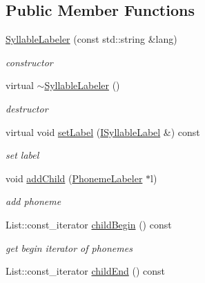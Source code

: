\subsection*{\-Public \-Member \-Functions}
\begin{DoxyCompactItemize}
\item 
\hypertarget{classsinsy_1_1SyllableLabeler_a91b3bff4ba682519268f7b9b1b477e45}{\hyperlink{classsinsy_1_1SyllableLabeler_a91b3bff4ba682519268f7b9b1b477e45}{\-Syllable\-Labeler} (const std\-::string \&lang)}\label{classsinsy_1_1SyllableLabeler_a91b3bff4ba682519268f7b9b1b477e45}

\begin{DoxyCompactList}\small\item\em constructor \end{DoxyCompactList}\item 
\hypertarget{classsinsy_1_1SyllableLabeler_a577205cd458a184e916c1308dbeeafe1}{virtual \hyperlink{classsinsy_1_1SyllableLabeler_a577205cd458a184e916c1308dbeeafe1}{$\sim$\-Syllable\-Labeler} ()}\label{classsinsy_1_1SyllableLabeler_a577205cd458a184e916c1308dbeeafe1}

\begin{DoxyCompactList}\small\item\em destructor \end{DoxyCompactList}\item 
\hypertarget{classsinsy_1_1SyllableLabeler_a162b6e74e23dafca1c14680fcf77446f}{virtual void \hyperlink{classsinsy_1_1SyllableLabeler_a162b6e74e23dafca1c14680fcf77446f}{set\-Label} (\hyperlink{classsinsy_1_1ISyllableLabel}{\-I\-Syllable\-Label} \&) const }\label{classsinsy_1_1SyllableLabeler_a162b6e74e23dafca1c14680fcf77446f}

\begin{DoxyCompactList}\small\item\em set label \end{DoxyCompactList}\item 
\hypertarget{classsinsy_1_1SyllableLabeler_ac8a4cfeb6b3c657b30d42f4470915523}{void \hyperlink{classsinsy_1_1SyllableLabeler_ac8a4cfeb6b3c657b30d42f4470915523}{add\-Child} (\hyperlink{classsinsy_1_1PhonemeLabeler}{\-Phoneme\-Labeler} $\ast$l)}\label{classsinsy_1_1SyllableLabeler_ac8a4cfeb6b3c657b30d42f4470915523}

\begin{DoxyCompactList}\small\item\em add phoneme \end{DoxyCompactList}\item 
\-List\-::const\-\_\-iterator \hyperlink{classsinsy_1_1SyllableLabeler_a49d114d213883cbeb6bc0c445ef36e7e}{child\-Begin} () const 
\begin{DoxyCompactList}\small\item\em get begin iterator of phonemes \end{DoxyCompactList}\item 
\hypertarget{classsinsy_1_1SyllableLabeler_a94ecf79a7f761d2d35e6d9cfe3d59938}{\-List\-::const\-\_\-iterator \hyperlink{classsinsy_1_1SyllableLabeler_a94ecf79a7f761d2d35e6d9cfe3d59938}{child\-End} () const }\label{classsinsy_1_1SyllableLabeler_a94ecf79a7f761d2d35e6d9cfe3d59938}


\end{DoxyCompactItemize}
